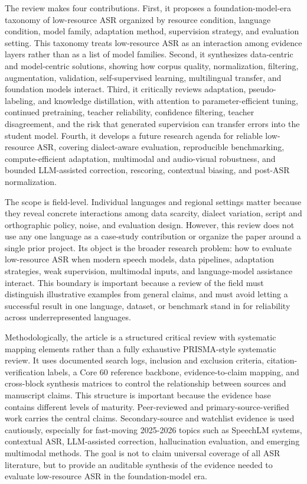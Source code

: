 \documentclass[pdflatex,sn-basic,iicol]{sn-jnl}
\theoremstyle{thmstyleone}
\theoremstyle{thmstyletwo}
\theoremstyle{thmstylethree}
\begin{document}
The review makes four contributions. First, it proposes a foundation-model-era taxonomy of low-resource ASR organized by resource condition, language condition, model family, adaptation method, supervision strategy, and evaluation setting. This taxonomy treats low-resource ASR as an interaction among evidence layers rather than as a list of model families. Second, it synthesizes data-centric and model-centric solutions, showing how corpus quality, normalization, filtering, augmentation, validation, self-supervised learning, multilingual transfer, and foundation models interact. Third, it critically reviews adaptation, pseudo-labeling, and knowledge distillation, with attention to parameter-efficient tuning, continued pretraining, teacher reliability, confidence filtering, teacher disagreement, and the risk that generated supervision can transfer errors into the student model. Fourth, it develops a future research agenda for reliable low-resource ASR, covering dialect-aware evaluation, reproducible benchmarking, compute-efficient adaptation, multimodal and audio-visual robustness, and bounded LLM-assisted correction, rescoring, contextual biasing, and post-ASR normalization.

The scope is field-level. Individual languages and regional settings matter because they reveal concrete interactions among data scarcity, dialect variation, script and orthographic policy, noise, and evaluation design. However, this review does not use any one language as a case-study contribution or organize the paper around a single prior project. Its object is the broader research problem: how to evaluate low-resource ASR when modern speech models, data pipelines, adaptation strategies, weak supervision, multimodal inputs, and language-model assistance interact. This boundary is important because a review of the field must distinguish illustrative examples from general claims, and must avoid letting a successful result in one language, dataset, or benchmark stand in for reliability across underrepresented languages.

Methodologically, the article is a structured critical review with systematic mapping elements rather than a fully exhaustive PRISMA-style systematic review. It uses documented search logs, inclusion and exclusion criteria, citation-verification labels, a Core 60 reference backbone, evidence-to-claim mapping, and cross-block synthesis matrices to control the relationship between sources and manuscript claims. This structure is important because the evidence base contains different levels of maturity. Peer-reviewed and primary-source-verified work carries the central claims. Secondary-source and watchlist evidence is used cautiously, especially for fast-moving 2025-2026 topics such as SpeechLM systems, contextual ASR, LLM-assisted correction, hallucination evaluation, and emerging multimodal methods. The goal is not to claim universal coverage of all ASR literature, but to provide an auditable synthesis of the evidence needed to evaluate low-resource ASR in the foundation-model era.
\end{document}
